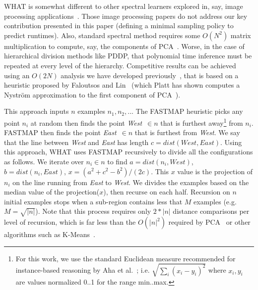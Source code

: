\documentclass{sig-alternative}
\begin{document}
WHAT is somewhat different to other spectral
learners explored in, say, image processing applications~\cite{shi00}.
Those image processing papers do not address
our key contribution presented in this paper  (defining
 a minimal sampling policy to predict runtimes).
Also,
standard spectral method requires some $O(N^2)$ matrix multiplication to compute, say, the components
of PCA~\cite{ilin10}. Worse, in the case of hierarchical division methods like PDDP,
that polynomial time inference must be repeated at every level of the hierarchy.
Competitive results can be achieved
using an $O(2N)$ analysis we have developed previously~\cite{me12d}, that is  based on  a heuristic proposed by
Faloutsos and Lin~\cite{Faloutsos1995}
(which
Platt has
  shown computes a Nystr\"om
  approximation to the first component of
  PCA~\cite{platt05}).
  
  This approach inputs
$n$
examples $n_1,n_2,..$. The FASTMAP heuristic
picks any
point $n_i$ at random then  finds
 the point  {\em West}~$\in n$ that is
furthest away\footnote{
 For this work, we use the standard Euclidean measure recommended for
instance-based reasoning by Aha et al.~\cite{aha91};
i.e. $\sqrt{\sum_i(x_i-y_i)^2}$ where $x_i,y_i$
are values normalized 0..1 for the range min..max.}
from $n_i$.
FASTMAP then
finds the point {\em East}~$\in n$
that is furthest from {\em West}.
We say that the line between {\em West} and {\em East} has  length  
$c=\mathit{dist}(\mathit{West},\mathit{East})$.
Using this  approach, WHAT uses FASTMAP recursively to divide all the configurations as follows.
We iterate over $n_i \in n$
to find
$a=\mathit{dist}(n_i,\mathit{West})$,
$b=\mathit{dist}(n_i,\mathit{East})$,
$x=(a^2 + c^2 - b^2)/(2c)$.
This  $x$ value is the projection of $n_i$
on the line  running  from {\em East} to {\em West}.  We divides
the examples based on the median value of the projection($x$),
then recurse on each half. Recursion on
$n$ initial
examples stops when a sub-region
contains less that  $M$ examples (e.g. 
$M=\sqrt{|n|}$).
Note that this process requires only $2*|n|$ distance comparisons
per level of recursion, which is far less than the $O(|n|^2)$
required by PCA~\cite{Du2008}
or other  algorithms such as K-Means~\cite{hamerly2010making}.
\end{document}
